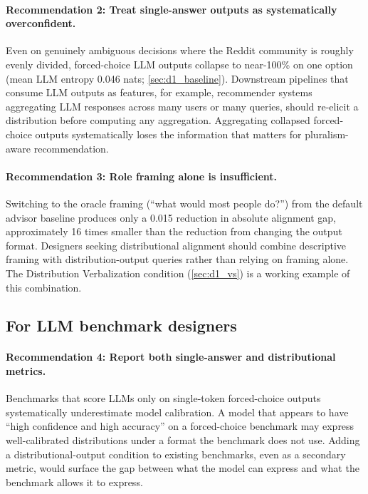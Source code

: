 \paragraph{Recommendation 2: Treat single-answer outputs as
systematically overconfident.} Even on genuinely ambiguous decisions
where the Reddit community is roughly evenly divided, forced-choice
LLM outputs collapse to near-100\% on one option (mean LLM entropy
0.046 nats; \cref{sec:d1_baseline}). Downstream pipelines that consume
LLM outputs as features, for example, recommender systems aggregating
LLM responses across many users or many queries, should re-elicit a
distribution before computing any aggregation. Aggregating collapsed
forced-choice outputs systematically loses the information that
matters for pluralism-aware recommendation.

\paragraph{Recommendation 3: Role framing alone is insufficient.}
Switching to the oracle framing (``what would most people do?'') from
the default advisor baseline produces only a 0.015
reduction in absolute alignment gap, approximately 16 times smaller
than the reduction from changing the output format. Designers seeking
distributional alignment should combine descriptive framing with
distribution-output queries rather than relying on framing alone. The
Distribution Verbalization condition (\cref{sec:d1_vs}) is a working
example of this combination.

\subsection{For LLM benchmark designers}
\label{sec:disc_benchmark}

\paragraph{Recommendation 4: Report both single-answer and
distributional metrics.} Benchmarks that score LLMs only on
single-token forced-choice outputs systematically underestimate model
calibration. A model that appears to have ``high confidence and high
accuracy'' on a forced-choice benchmark may express well-calibrated
distributions under a format the benchmark does not use. Adding a
distributional-output condition to existing benchmarks, even as a
secondary metric, would surface the gap between what the model can
express and what the benchmark allows it to express.

